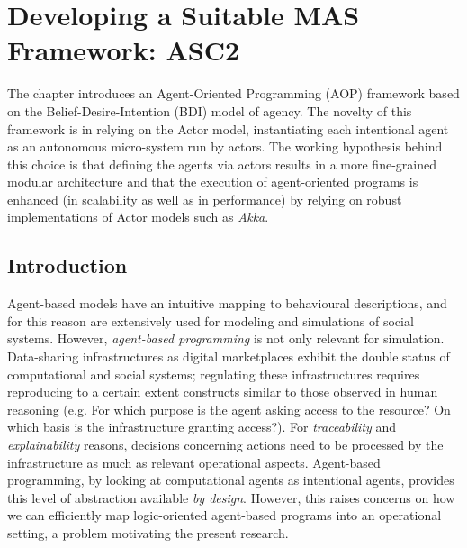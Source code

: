 \chapter{Developing a Suitable MAS Framework: ASC2}
The chapter introduces an Agent-Oriented Programming (AOP) framework based on the Belief-Desire-Intention (BDI) model of agency. The novelty of this framework is in relying on the Actor model, instantiating each intentional agent as an autonomous micro-system run by actors. The working hypothesis behind this choice is that defining the agents via actors results in a more fine-grained modular architecture and that the execution of agent-oriented programs is enhanced (in scalability as well as in performance) by relying on robust implementations of Actor models such as \textit{Akka}.


\section{Introduction}
Agent-based models have an intuitive mapping to behavioural descriptions, and for this reason are extensively used for modeling and simulations of social systems. However, \textit{agent-based programming} is not only relevant for simulation. Data-sharing infrastructures as digital marketplaces exhibit the double status of computational and social systems; regulating these infrastructures requires reproducing to a certain extent constructs similar to those observed in human reasoning (e.g. For which purpose is the agent asking access to the resource? On which basis is the infrastructure granting access?). For \textit{traceability} and \textit{explainability} reasons, decisions concerning actions need to be processed by the infrastructure as much as relevant operational aspects. Agent-based programming, by looking at computational agents as intentional agents, provides this level of abstraction available \textit{by design}. However, this raises concerns on how we can efficiently map logic-oriented agent-based programs into an operational setting, a problem motivating the present research.


